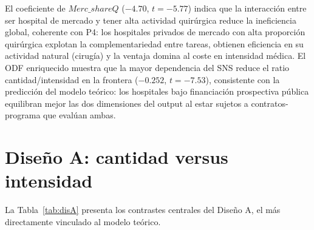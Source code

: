 \documentclass[12pt, a4paper, twoside, openright]{book}
\theoremstyle{plain}
\theoremstyle{definition}
\theoremstyle{remark}
\begin{document}
El coeficiente de $Merc\_shareQ$ ($-4.70$, $t=-5.77$) indica que la interacción entre ser hospital de mercado y tener alta actividad quirúrgica reduce la ineficiencia global, coherente con P4: los hospitales privados de mercado con alta proporción quirúrgica explotan la complementariedad entre tareas, obtienen eficiencia en su actividad natural (cirugía) y la ventaja domina al coste en intensidad médica. El ODF enriquecido muestra que la mayor dependencia del SNS reduce el ratio cantidad/intensidad en la frontera ($-0.252$, $t=-7.53$), consistente con la predicción del modelo teórico: los hospitales bajo financiación prospectiva pública equilibran mejor las dos dimensiones del output al estar sujetos a contratos-programa que evalúan ambas.


\section{Diseño A: cantidad versus intensidad}
\label{sec:res_A}

La Tabla~\ref{tab:disA} presenta los contrastes centrales del Diseño A, el más directamente vinculado al modelo teórico.
\end{document}
